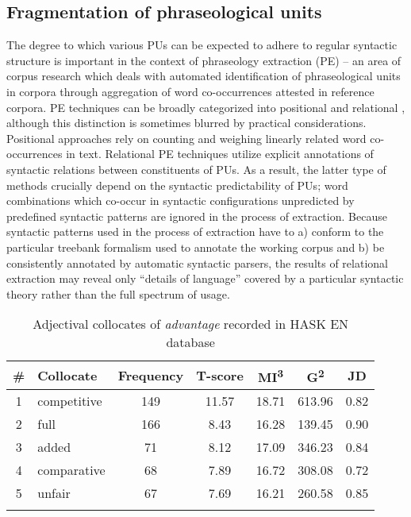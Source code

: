 \documentclass[output=paper]{langscibook}
\begin{document}
\subsection{Fragmentation of phraseological units}

The degree to which various PUs can be expected to adhere to regular syntactic structure is important in the context of phraseology extraction (PE) -- an area of corpus research which deals with automated identification of phraseological units in corpora through aggregation of word co-occurrences attested in reference corpora. PE techniques can be broadly categorized into positional and relational \citep{Evert2005}, although this distinction is sometimes blurred by practical considerations. Positional approaches rely on counting and weighing linearly related word co-occurrences in text. Relational PE techniques utilize explicit annotations of syntactic relations between constituents of PUs. As a result, the latter type of methods crucially depend on the syntactic predictability of PUs; word combinations which co-occur in syntactic configurations unpredicted by predefined syntactic patterns are ignored in the process of extraction. Because syntactic patterns used in the process of extraction have to a) conform to the particular treebank formalism used to annotate the working corpus and b) be consistently annotated by automatic syntactic parsers, the results of relational extraction may reveal only “details of language” covered by a particular syntactic theory \citep[4]{Sinclair1991} rather than the full spectrum of usage.

\begin{table}[b]
\begin{tabular}{cl S[table-format=3.1] S[table-format=2.2] S[table-format=2.5] S[table-format=3.3] S[table-format=1.2]}
\lsptoprule
{\#} & {Collocate} & {Frequency} & {T-score} & {MI\textsuperscript{3}} & {G\textsuperscript{2}} & {JD}\\
 & competitive & 149 & 11.57 & 18.71 & 613.96 & 0.82\\
2 & full & 166 & 8.43 & 16.28 & 139.45 & 0.90\\
3 & added & 71 & 8.12 & 17.09 & 346.23 & 0.84\\
4 & comparative & 68 & 7.89 & 16.72 & 308.08 & 0.72\\
5 & unfair & 67 & 7.69 & 16.21 & 260.58 & 0.85\\
\lspbottomrule
\end{tabular}
\caption{\label{tab:pezik:2} Adjectival collocates of \textit{advantage} recorded in HASK EN database}
\end{table}
\end{document}
